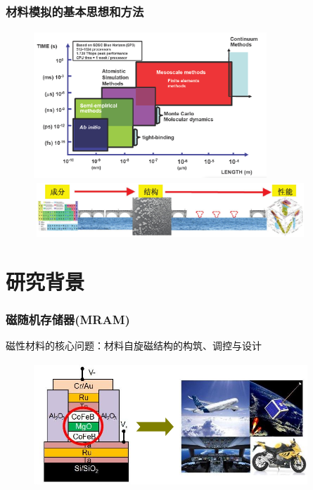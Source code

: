 \documentclass[cjk,slidestop,compress,mathserif,blue]{beamer}
\begin{document}
\frame
{
	\frametitle{材料模拟的基本思想和方法}
\begin{figure}[h!]
\vspace*{-0.20in}
\centering
\includegraphics[height=2.20in,width=3.45in]{Figures/Multi-Scale-6.png}
\vskip 0.05pt
\includegraphics[height=0.80in,width=4.05in]{Figures/MGE-2.png}
\label{Multi-Scale}
\end{figure}
}

\section{研究背景}
\frame
{
	\frametitle{磁随机存储器\textrm{(MRAM)}}
磁性材料的核心问题：材料自旋磁结构的构筑、调控与设计
\begin{figure}[h!]
\centering
\includegraphics[height=1.85in,width=4.05in]{Figures/MRAM-Devices.png}
\label{Fig:MRAM-Devices}
\end{figure}
}
\end{document}
